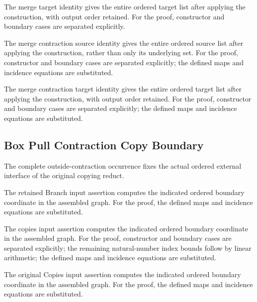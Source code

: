 The merge target identity gives the entire ordered target list after applying the construction, with output order retained.
For the proof, constructor and boundary cases are separated explicitly.
\par{}

The merge contraction source identity gives the entire ordered source list after applying the construction, rather than only its underlying set.
For the proof, constructor and boundary cases are separated explicitly; the defined maps and incidence equations are substituted.
\par{}

The merge contraction target identity gives the entire ordered target list after applying the construction, with output order retained.
For the proof, constructor and boundary cases are separated explicitly; the defined maps and incidence equations are substituted.
\par{}

\subsection{Box Pull Contraction Copy Boundary}
The complete outside-contraction occurrence fixes the actual ordered external interface of the original copying reduct.

The retained Branch input assertion computes the indicated ordered boundary coordinate in the assembled graph.
For the proof, the defined maps and incidence equations are substituted.
\par{}

The copies input assertion computes the indicated ordered boundary coordinate in the assembled graph.
For the proof, constructor and boundary cases are separated explicitly; the remaining natural-number index bounds follow by linear arithmetic; the defined maps and incidence equations are substituted.
\par{}

The original Copies input assertion computes the indicated ordered boundary coordinate in the assembled graph.
For the proof, the defined maps and incidence equations are substituted.
\par{}

